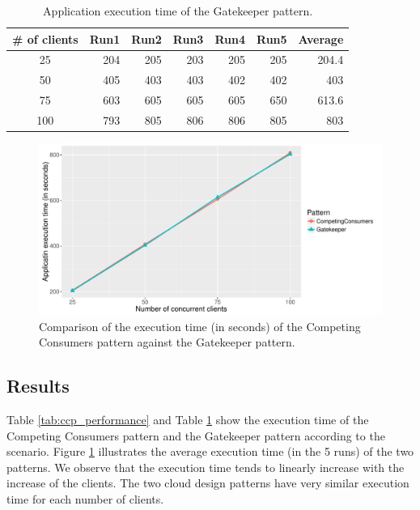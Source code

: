 \documentclass{article}
\begin{document}
\begin{table}[]
    \centering
    \caption{Application execution time of the Gatekeeper pattern.}
    \label{tab:gatekeeper_performance}
    \begin{tabular}{|c|r|r|r|r|r|r|}
        \hline
        \textbf{\# of clients} & \textbf{Run1} & \textbf{Run2} & \textbf{Run3} & \textbf{Run4} & \textbf{Run5} & \textbf{Average}\\ \hline
        25 & 204 & 205 & 203 & 205 & 205 & 204.4 \\ \hline 
        50 & 405 & 403 & 403 & 402 & 402 & 403 \\ \hline
        75 & 603 & 605 & 605 & 605 & 650 & 613.6 \\ \hline
        100 & 793 & 805 & 806 & 806 & 805 & 803 \\ \hline
	\end{tabular}
\end{table}

\begin{figure}[t]
    \centering
        \includegraphics[width = \columnwidth]{images/performance.pdf}
    \caption{Comparison of the execution time (in seconds) of the Competing Consumers pattern against the Gatekeeper pattern.}
    \label{fig:performance}
\end{figure}


\subsection{Results}
Table \ref{tab:ccp_performance} and Table \ref{tab:gatekeeper_performance} show the execution time of the Competing Consumers pattern and the Gatekeeper pattern according to the scenario. Figure \ref{fig:performance} illustrates the average execution time (in the 5 runs) of the two patterns. We observe that the execution time tends to linearly increase with the increase of the clients. The two cloud design patterns have very similar execution time for each number of clients.\\
\end{document}
